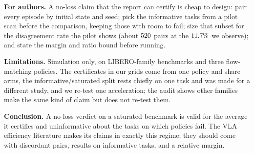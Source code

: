 \documentclass[conference]{IEEEtran}
\begin{document}
\begin{table}[t]
\centering
\caption{The three-part report for one step vs.\ ten at horizon 10.
$b$--$c$: pairs won by one step vs.\ by ten. (i) exact conditional
odds-ratio interval; (ii) paired Newcombe 95\% interval; (iii)
failure-rate ratio with init-cluster bootstrap interval. Verdict from
(ii) and McNemar; a claim is certified only if (ii) holds on the
informative tasks and (iii) stays below the declared bound.}
\label{tab:report}
\setlength{\tabcolsep}{2.5pt}
\resizebox{\columnwidth}{!}{}
\end{table}

\textbf{For authors.} A no-loss claim that the report can certify is
cheap to design: pair every episode by initial state and seed; pick the
informative tasks from a pilot scan before the comparison, keeping those
with room to fail; size that subset for the disagreement rate the pilot
shows (about $520$ pairs at the $11.7\%$ we
observe); and state the margin and ratio bound before running.

\textbf{Limitations.} Simulation only, on LIBERO-family benchmarks and
three flow-matching policies. The certificates in our grids come from
one policy and share arms, the informative/saturated split rests chiefly
on one task and was made for a different study, and we re-test one
acceleration; the audit shows other families make the same kind of
claim but does not re-test them.

\textbf{Conclusion.} A no-loss verdict on a saturated benchmark is valid
for the average it certifies and uninformative about the tasks on which
policies fail. The VLA efficiency literature makes its claims in exactly
this regime; they should come with discordant pairs, results on
informative tasks, and a relative margin.



\end{document}
